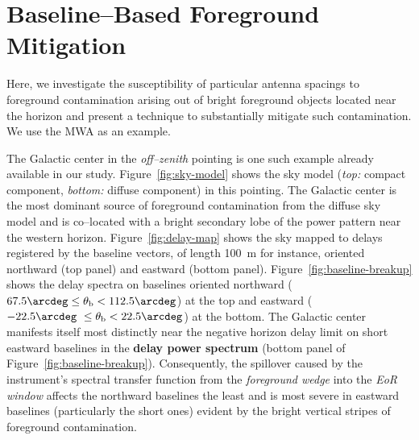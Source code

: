 \documentclass[preprint2,iop,numberedappendix]{emulateapj}
\begin{document}
\section{Baseline--Based Foreground Mitigation}\label{sec:fg-grading}

Here, we investigate the susceptibility of particular antenna spacings to foreground contamination arising out of bright foreground objects located near the horizon and present a technique to substantially mitigate such contamination. We use the MWA as an example.

The Galactic center in the {\it off--zenith} pointing is one such example already available in our study. Figure~\ref{fig:sky-model} shows the sky model ({\it top:} compact component, {\it bottom:} diffuse component) in this pointing. The Galactic center is the most dominant source of foreground contamination from the diffuse sky model and is co--located with a bright secondary lobe of the power pattern near the western horizon. Figure~\ref{fig:delay-map} shows the sky mapped to delays registered by the baseline vectors, of length 100~m for instance, oriented northward (top panel) and eastward (bottom panel). Figure~\ref{fig:baseline-breakup} shows the delay spectra on baselines oriented northward ($67.5\arcdeg\le \theta_\textrm{b} < 112.5\arcdeg$) at the top and eastward ($-22.5\arcdeg~\le \theta_\textrm{b} < 22.5\arcdeg$) at the bottom. The Galactic center manifests itself most distinctly near the negative horizon delay limit on short eastward baselines in the {\bf delay power spectrum} (bottom panel of Figure~\ref{fig:baseline-breakup}). Consequently, the spillover caused by the instrument's spectral transfer function from the {\it foreground wedge} into the {\it EoR window} affects the northward baselines the least and is most severe in eastward baselines (particularly the short ones) evident by the bright vertical stripes of foreground contamination. 
\end{document}
